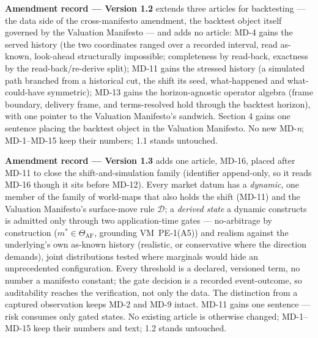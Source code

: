 \documentclass[11pt,a4paper]{article}
\begin{document}
\medskip
\noindent\textbf{Amendment record --- Version 1.2} extends three articles for
backtesting --- the data side of the cross-manifesto amendment, the backtest
object itself governed by the Valuation Manifesto --- and adds no article: MD-4
gains the served history (the two coordinates ranged over a recorded interval,
read as-known, look-ahead structurally impossible; completeness by read-back,
exactness by the read-back/re-derive split); MD-11 gains the stressed history (a
simulated path branched from a historical cut, the shift its seed,
what-happened and what-could-have symmetric); MD-13 gains the horizon-agnostic
operator algebra (frame boundary, delivery frame, and terms-resolved hold
through the backtest horizon), with one pointer to the Valuation Manifesto's
sandwich. Section 4 gains one sentence placing the backtest object in the
Valuation Manifesto. No new MD-\emph{n}; MD-1--MD-15 keep their numbers; 1.1
stands untouched.

\medskip
\noindent\textbf{Amendment record --- Version 1.3} adds one article, MD-16, placed
after MD-11 to close the shift-and-simulation family (identifier append-only, so it
reads MD-16 though it sits before MD-12). Every market datum has a \emph{dynamic},
one member of the family of world-maps that also holds the shift (MD-11) and the
Valuation Manifesto's surface-move rule $\mathcal{D}$; a \emph{derived state} a
dynamic constructs is admitted only through two application-time gates ---
no-arbitrage by construction ($m^\ast\in\Theta_{\mathrm{AF}}$, grounding
VM~PE-1(A5)) and realism against the underlying's own as-known history (realistic,
or conservative where the direction demands), joint distributions tested where
marginals would hide an unprecedented configuration. Every threshold is a declared,
versioned term, no number a manifesto constant; the gate decision is a recorded
event-outcome, so auditability reaches the verification, not only the data. The
distinction from a captured observation keeps MD-2 and MD-9 intact. MD-11 gains one
sentence --- risk consumes only gated states. No existing article is otherwise
changed; MD-1--MD-15 keep their numbers and text; 1.2 stands untouched.
\end{document}
